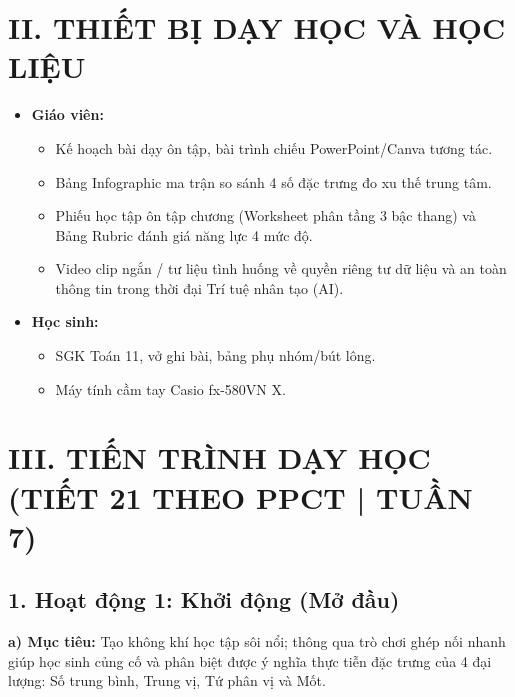 \documentclass[12pt, a4paper]{article}
\begin{document}
\section*{II. THIẾT BỊ DẠY HỌC VÀ HỌC LIỆU}

\begin{itemize}[leftmargin=1.2cm]
    \item \textbf{Giáo viên:}
    \begin{itemize}[leftmargin=0.6cm]
        \item Kế hoạch bài dạy ôn tập, bài trình chiếu PowerPoint/Canva tương tác.
        \item Bảng Infographic ma trận so sánh 4 số đặc trưng đo xu thế trung tâm.
        \item Phiếu học tập ôn tập chương (Worksheet phân tầng 3 bậc thang) và Bảng Rubric đánh giá năng lực 4 mức độ.
        \item Video clip ngắn / tư liệu tình huống về quyền riêng tư dữ liệu và an toàn thông tin trong thời đại Trí tuệ nhân tạo (AI).
    \end{itemize}
    \item \textbf{Học sinh:}
    \begin{itemize}[leftmargin=0.6cm]
        \item SGK Toán 11, vở ghi bài, bảng phụ nhóm/bút lông.
        \item Máy tính cầm tay Casio fx-580VN X.
    \end{itemize}
\end{itemize}

\section*{III. TIẾN TRÌNH DẠY HỌC (TIẾT 21 THEO PPCT | TUẦN 7)}

\subsection*{1. Hoạt động 1: Khởi động (Mở đầu)}

\noindent \textbf{a) Mục tiêu:}
Tạo không khí học tập sôi nổi; thông qua trò chơi ghép nối nhanh giúp học sinh củng cố và phân biệt được ý nghĩa thực tiễn đặc trưng của 4 đại lượng: Số trung bình, Trung vị, Tứ phân vị và Mốt.
\end{document}
